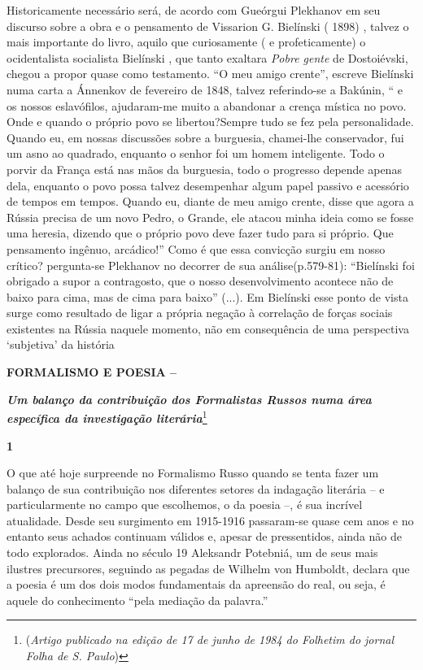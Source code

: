 Historicamente necessário será, de acordo com Gueórgui Plekhanov em seu
discurso sobre a obra e o pensamento de Vissarion G. Bielínski ( 1898) ,
talvez o mais importante do livro, aquilo que curiosamente ( e
profeticamente) o ocidentalista socialista Bielínski , que tanto
exaltara \emph{Pobre gente} de Dostoiévski, chegou a propor quase como
testamento. ``O meu amigo crente'', escreve Bielínski numa carta a
Ánnenkov de fevereiro de 1848, talvez referindo-se a Bakúnin, `` e os
nossos eslavófilos, ajudaram-me muito a abandonar a crença mística no
povo. Onde e quando o próprio povo se libertou?Sempre tudo se fez pela
personalidade. Quando eu, em nossas discussões sobre a burguesia,
chamei-lhe conservador, fui um asno ao quadrado, enquanto o senhor foi
um homem inteligente. Todo o porvir da França está nas mãos da
burguesia, todo o progresso depende apenas dela, enquanto o povo possa
talvez desempenhar algum papel passivo e acessório de tempos em tempos.
Quando eu, diante de meu amigo crente, disse que agora a Rússia precisa
de um novo Pedro, o Grande, ele atacou minha ideia como se fosse uma
heresia, dizendo que o próprio povo deve fazer tudo para si próprio. Que
pensamento ingênuo, arcádico!'' Como é que essa convicção surgiu em
nosso crítico? pergunta-se Plekhanov no decorrer de sua
análise(p.579-81): ``Bielínski foi obrigado a supor a contragosto, que o
nosso desenvolvimento acontece não de baixo para cima, mas de cima para
baixo'' (...). Em Bielínski esse ponto de vista surge como resultado de
ligar a própria negação à correlação de forças sociais existentes na
Rússia naquele momento, não em consequência de uma perspectiva
`subjetiva' da história

\textbf{FORMALISMO E POESIA --}

\emph{\textbf{Um balanço da contribuição dos Formalistas Russos numa
área específica da investigação literária}}\footnote{(\emph{Artigo
  publicado na edição de 17 de junho de 1984 do Folhetim do jornal Folha
  de S. Paulo})}

\textbf{1}

O que até hoje surpreende no Formalismo Russo quando se tenta fazer um
balanço de sua contribuição nos diferentes setores da indagação
literária -- e particularmente no campo que escolhemos, o da poesia --,
é sua incrível atualidade. Desde seu surgimento em 1915-1916 passaram-se
quase cem anos e no entanto seus achados continuam válidos e, apesar de
pressentidos, ainda não de todo explorados. Ainda no século 19 Aleksandr
Potebniá, um de seus mais ilustres precursores, seguindo as pegadas de
Wilhelm von Humboldt, declara que a poesia é um dos dois modos
fundamentais da apreensão do real, ou seja, é aquele do conhecimento
``pela mediação da palavra.''

